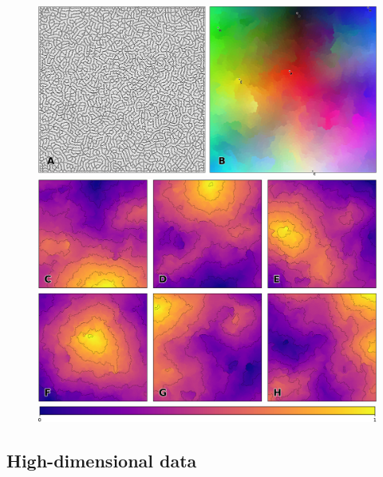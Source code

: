 \begin{figure}
  \includegraphics[width=\columnwidth]{figures/vsom-colors-1.pdf}

  \vspace{2mm}
  
  \includegraphics[width=\columnwidth]{figures/vsom-colors-2.pdf}

  \vspace{2mm}

  \includegraphics[width=\columnwidth]{figures/colormap.pdf}

  \caption{}
\end{figure}

\subsection{High-dimensional data}






